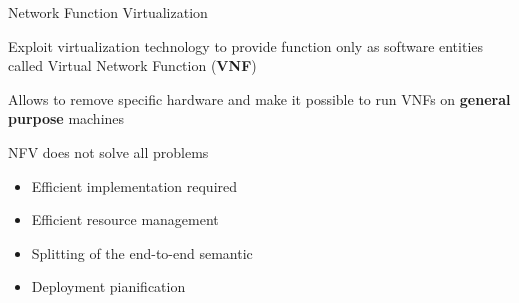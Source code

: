 \begin{frame}{Network Function Virtualization}

  Exploit virtualization technology to provide function only as
  software entities called Virtual Network Function (\textbf{VNF})

  \vfill{}

  Allows to remove specific hardware and make it possible to run VNFs on
  \textbf{general purpose} machines

  \vfill{}

  NFV does not solve all problems
  \begin{itemize}
    \item Efficient implementation required
    \item Efficient resource management
    \item Splitting of the end-to-end semantic
    \item Deployment pianification
  \end{itemize}

  \vfill{}

\end{frame}